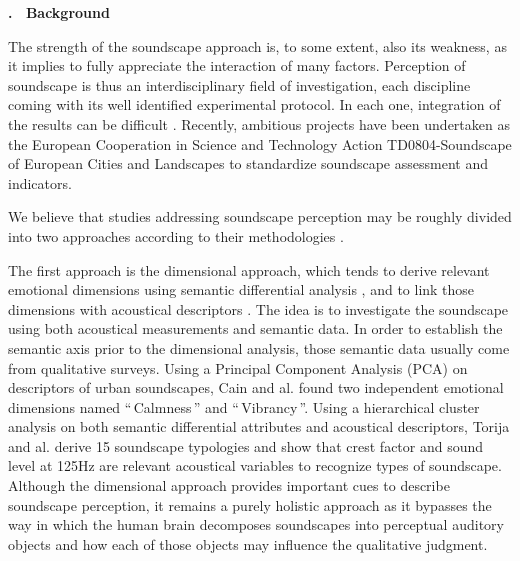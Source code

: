 \documentclass[12pt, titlepage, reqno]{article} %
\renewcommand{\section}[1]{\medskip \addtocounter{section}{1}\raggedright 
     \textbf{\Roman{section}. \ #1}\medskip \setcounter{subsection}{0}
    \setlength{\parindent}{5ex}
 }
\begin{document}
\section{Background}

The strength of the soundscape approach is, to some extent, also its weakness, as it implies to  fully appreciate the interaction of many factors. Perception of soundscape is thus an interdisciplinary field of investigation, each discipline coming with its well identified experimental protocol. In each one, integration of the results can be difficult \cite{davies_perception_2013, schulte-fortkamp_soundscape:_2007}. Recently, ambitious projects have been undertaken as the European Cooperation in Science and Technology Action TD0804-Soundscape of European Cities and Landscapes to standardize soundscape assessment and indicators. 

We believe that studies addressing soundscape perception may be roughly divided into two approaches according to their methodologies \cite{davies_perception_2013}. 

The first approach is the dimensional approach, which tends to derive relevant emotional dimensions using semantic differential analysis  \cite{cain_development_2013, jeon2013soundwalk, kang_semantic_2010}, and to link those dimensions with acoustical descriptors \cite{torija2013application}. The idea is to investigate the soundscape using both acoustical measurements and semantic data.  In order to establish the semantic axis \cite{davies_perception_2013} prior to the dimensional analysis, those semantic data usually come from qualitative surveys. Using a Principal Component Analysis (PCA) on descriptors of urban soundscapes, Cain and al.\citep{cain_development_2013,davies_perception_2013} found two independent emotional dimensions named ``\,Calmness\,'' and ``\,Vibrancy\,''.  Using a hierarchical cluster analysis on both semantic differential attributes and acoustical descriptors, Torija and al. \cite{torija2013application}  derive 15 soundscape typologies and show that crest factor and sound level at 125Hz are relevant acoustical variables to recognize types of soundscape. Although the dimensional approach provides important cues to describe soundscape perception, it remains a purely holistic approach as it bypasses the way in which the human brain decomposes soundscapes into perceptual auditory objects \cite{bregman1994auditory, winkler2009modeling} and how each of those objects may influence the qualitative judgment. 
\end{document}

